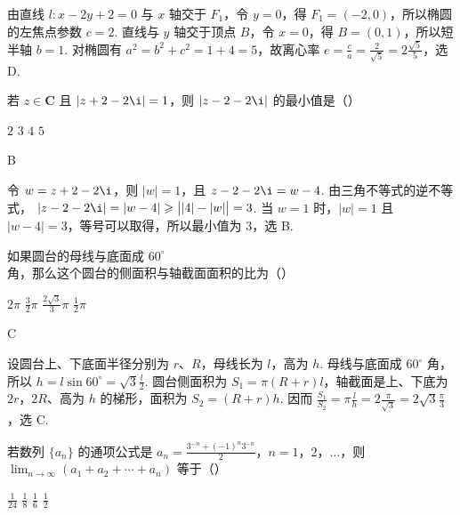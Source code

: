 \begin{solution}
由直线 \(l:x-2y+2=0\) 与 \(x\) 轴交于 \(F_1\)，令 \(y=0\)，得 \(F_1=(-2,0)\)，所以椭圆的左焦点参数 \(c=2\). 直线与 \(y\) 轴交于顶点 \(B\)，令 \(x=0\)，得 \(B=(0,1)\)，所以短半轴 \(b=1\). 对椭圆有 \(a^2=b^2+c^2=1+4=5\)，故离心率 \(e=\frac{c}{a}=\frac{2}{\sqrt5}=2\frac{\sqrt5}{5}\)，选 D.
\end{solution}

\begin{problem}
若 \(z \in \mathbf{C}\) 且 \(\left|z + 2 - 2\i\right| = 1\)，则 \(\left|z - 2 - 2\i\right|\) 的最小值是（\quad）

\choices
    {\(2\)}
    {\(3\)}
    {\(4\)}
    {\(5\)}
\end{problem}

\begin{answer}
B
\end{answer}

\begin{solution}
令 \(w=z+2-2\i\)，则 \(\lvert w\rvert=1\)，且
\(z-2-2\i=w-4\). 由三角不等式的逆不等式，
\(\lvert z-2-2\i\rvert=\lvert w-4\rvert\geqslant\bigl|\lvert4\rvert-\lvert w\rvert\bigr|=3\). 当 \(w=1\) 时，\(\lvert w\rvert=1\) 且 \(\lvert w-4\rvert=3\)，等号可以取得，所以最小值为 \(3\)，选 B.
\end{solution}

\begin{problem}
如果圆台的母线与底面成 \(60^{\circ}\) 角，那么这个圆台的侧面积与轴截面面积的比为（\quad）

\choices
    {\(2\pi\)}
    {\(\frac{3}{2}\pi\)}
    {\(\frac{2\sqrt{3}}{3}\pi\)}
    {\(\frac{1}{2}\pi\)}
\end{problem}

\begin{answer}
C
\end{answer}

\begin{solution}
设圆台上、下底面半径分别为 \(r\)、\(R\)，母线长为 \(l\)，高为 \(h\). 母线与底面成 \(60^\circ\) 角，所以 \(h=l\sin60^\circ=\sqrt3\frac{l}{2}\). 圆台侧面积为 \(S_1=\pi(R+r)l\)，轴截面是上、下底为 \(2r\)，\(2R\)、高为 \(h\) 的梯形，面积为 \(S_2=(R+r)h\). 因而 \(\frac{S_1}{S_2}=\pi \frac{l}{h}=2\frac{\pi}{\sqrt3}=2\sqrt3\frac{\pi}{3}\)，选 C.
\end{solution}

\begin{problem}
若数列 \(\{a_n\}\) 的通项公式是 \(a_n = \frac{3^{-n} + (-1)^n 3^{-n}}{2}\)，\(n = 1\)，\(2\)，\(\ldots\)，则 \(\displaystyle\lim_{n \to \infty}(a_1 + a_2 + \cdots + a_n)\) 等于（\quad）

\choices
    {\(\frac{1}{24}\)}
    {\(\frac{1}{8}\)}
    {\(\frac{1}{6}\)}
    {\(\frac{1}{2}\)}
\end{problem}

